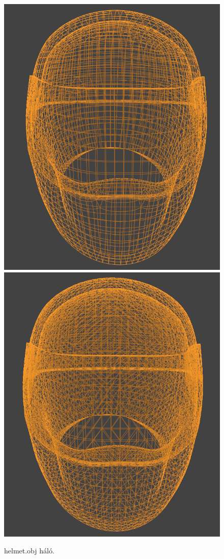 \begin{figure}[h]
\centering
\includegraphics[scale=0.32]{images/helmet1.png}
\includegraphics[scale=0.32]{images/helmet2.png}
\caption{helmet.obj háló.}
\label{fig:tri2}
\end{figure}


